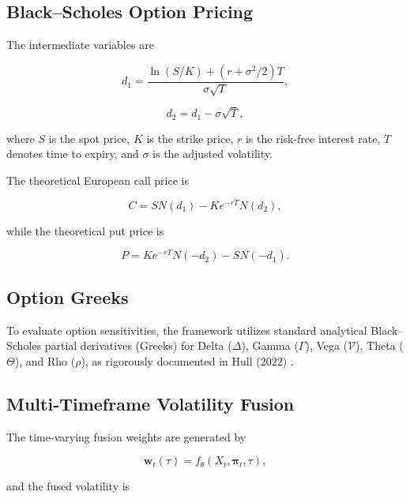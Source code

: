 \documentclass[journal]{IEEEtran}
\begin{document}
\subsection{Black--Scholes Option Pricing}

The intermediate variables are

\begin{equation}
d_1 = \frac{\ln(S/K)+(r+\sigma^2/2)T}{\sigma\sqrt{T}},
\end{equation}

\begin{equation}
d_2 = d_1 - \sigma\sqrt{T},
\end{equation}

where $S$ is the spot price, $K$ is the strike price, $r$ is the
risk-free interest rate, $T$ denotes time to expiry, and $\sigma$ is
the adjusted volatility.

The theoretical European call price is

\begin{equation}
C = SN(d_1) - Ke^{-rT}N(d_2),
\end{equation}

while the theoretical put price is

\begin{equation}
P = Ke^{-rT}N(-d_2) - SN(-d_1).
\end{equation}

\subsection{Option Greeks}

To evaluate option sensitivities, the framework utilizes standard
analytical Black--Scholes partial derivatives (Greeks) for Delta
($\Delta$), Gamma ($\Gamma$), Vega ($\mathcal{V}$), Theta ($\Theta$),
and Rho ($\rho$), as rigorously documented in Hull (2022)
\cite{hull2022}.

\subsection{Multi-Timeframe Volatility Fusion}

The time-varying fusion weights are generated by

\begin{equation}
\label{eq:adaptive_fusion_weights}
\mathbf{w}_t(\tau) = f_{\theta}\!\left(X_t,\boldsymbol{\pi}_t,\tau\right),
\end{equation}

and the fused volatility is
\end{document}
